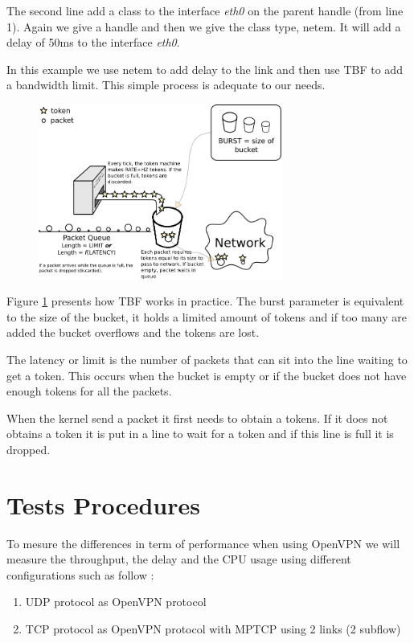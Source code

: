   The second line add a class to the interface \textit{eth0} on the parent handle (from line 1). Again we give a handle and then we give the class type,
  netem. It will add a delay of 50ms to the interface \textit{eth0}.

  In this example we use netem to add delay to the link and then use TBF to add a bandwidth limit. This simple process is adequate to our needs.


    \begin{figure}[h!]
     \centering
     \includegraphics[width=8cm]{./images/tc.png}
     \label{fig_tbf}
    \end{figure}

    Figure \ref{fig_tbf} presents how TBF works in practice. The burst parameter is equivalent to the size of the bucket, it holds a limited amount of tokens and if
    too many are added the bucket overflows and the tokens are lost.

    The latency or limit is the number of packets that can sit into the line waiting to get a token.
    This occurs when the bucket is empty or if the bucket does not have enough tokens for all the packets.

    When the kernel send a packet it first needs to obtain a tokens.
    If it does not obtains a token it is put in a line to wait for a token and if this line is full it is dropped.

  \section{Tests Procedures}

  To mesure the differences in term of performance when using OpenVPN we will measure the throughput, the delay and the CPU usage using different configurations such as follow :

  \begin{enumerate}
    \item UDP protocol as OpenVPN protocol
    \item TCP protocol as OpenVPN protocol with MPTCP using 2 links (2 subflow)
  \end{enumerate}

